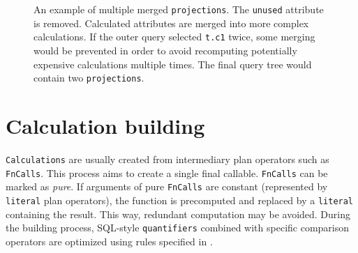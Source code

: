 \begin{figure}[htpb]
    \caption{An example of multiple merged \texttt{projections}. The \texttt{unused} attribute is removed. Calculated attributes are merged into more complex calculations. If the outer query selected \texttt{t.c1} twice, some merging would be prevented in order to avoid recomputing potentially expensive calculations multiple times. The final query tree would contain two \texttt{projections}.}
\end{figure}

\section{Calculation building}
\label{sec:calc-building}

\texttt{Calculations} are usually created from intermediary plan operators such as \texttt{FnCalls}. This process aims to create a single final callable. \texttt{FnCalls} can be marked as \textit{pure}. If arguments of pure \texttt{FnCalls} are constant (represented by \texttt{literal} plan operators), the function is precomputed and replaced by a \texttt{literal} containing the result. This way, redundant computation may be avoided. During the building process, SQL-style \texttt{quantifiers} combined with specific comparison operators are optimized using rules specified in \cite{holsch2016optimization}.